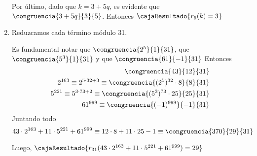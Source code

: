 \begin{enumerate}[label=(\alph*)]
        Por último, dado que $k=3+5q$, es evidente que $\congruencia{3+5q}{3}{5}$. Entonces $\cajaResultado{r_5(k)=3}$

  \item Reduzcamos cada término módulo 31.

        Es fundamental notar que $\congruencia{2^5}{1}{31}$, que $\congruencia{5^3}{1}{31}$ y que $\congruencia{61}{-1}{31}$
        Entonces
        \begin{align*}
          \congruencia{43}{12}{31}                                                         \\
          2^{163} \equiv 2^{5 \cdot 32 + 3} \equiv \congruencia{(2^5)^{32} \cdot 8}{8}{31} \\
          5^{221} \equiv 5^{3 \cdot 73+2} \equiv \congruencia{(5^3)^{73} \cdot 25}{25}{31} \\
          61^{999} \equiv \congruencia{(-1)^{999}}{-1}{31}
        \end{align*}
        Juntando todo
        $$
          43 \cdot 2^{163} + 11 \cdot 5^{221} + 61^{999}
          \equiv
          12 \cdot 8 + 11 \cdot 25 -1
          \equiv
          \congruencia{370}{29}{31}
        $$

        Luego, $\cajaResultado{r_{31}(43 \cdot 2^{163} + 11 \cdot 5^{221} + 61^{999})=29}$
\end{enumerate}

\begin{aportes}
  \item {}
\end{aportes}
